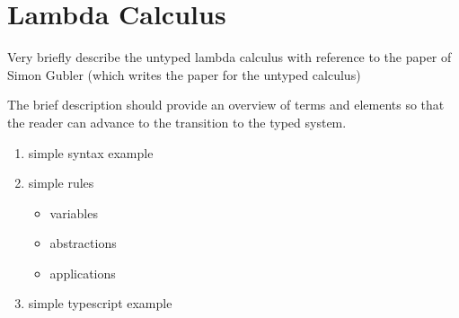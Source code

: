 \section{Lambda Calculus}

Very briefly describe the untyped lambda calculus
with reference to the paper of Simon Gubler
(which writes the paper for the untyped calculus)

The brief description should provide an overview of
terms and elements so that the reader can advance
to the transition to the typed system.

\begin{enumerate}
    \item simple syntax example
    \item simple rules
          \begin{itemize}
              \item variables
              \item abstractions
              \item applications
          \end{itemize}
    \item simple typescript example \cite{lambdaCalcInTS}
\end{enumerate}
